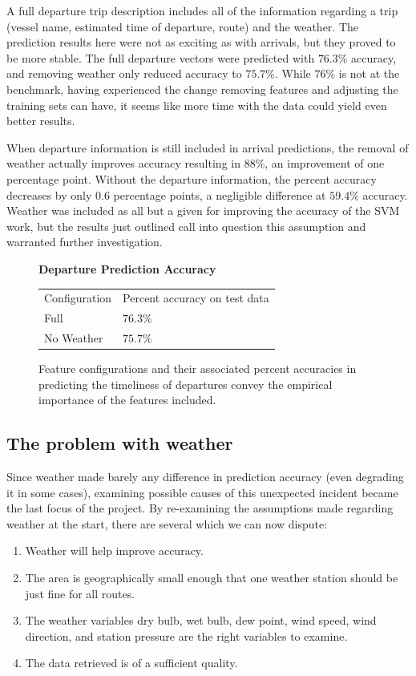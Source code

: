 \documentclass[11pt]{article} %
\begin{document}
A full departure trip description includes all of the information regarding a trip
(vessel name, estimated time of departure, route) and the weather. 
The prediction results here were not
as exciting as with arrivals, but they proved to be more stable. The full 
departure vectors were predicted with $76.3\%$ accuracy, and removing weather
only reduced accuracy to $75.7\%$. While $76\%$ is not at the benchmark, having
experienced the change removing features and adjusting the training sets can have,
it seems like more time with the data could yield even better results.

When departure information is still included in arrival predictions, the removal of 
weather actually improves accuracy resulting in $88\%$, an improvement of one
percentage point. Without the departure information, the percent accuracy decreases
by only $0.6$ percentage points, a negligible difference at $59.4\%$ accuracy. 
Weather was included as all but a given for improving the accuracy of the SVM
work, but the results just outlined call into question this assumption and 
warranted further investigation.

\begin{figure}
    \centering
    \textbf{Departure Prediction Accuracy}

    \begin{tabular}{ll}
        Configuration & Percent accuracy on test data\\
        Full        & $76.3\%$\\
        No Weather  & $75.7\%$\\
    \end{tabular}
    \caption{Feature configurations and their associated percent accuracies in
         predicting the timeliness of departures convey the empirical importance of 
         the features included.}
    \label{fig:second_run_data_departures}
\end{figure}

\subsection{The problem with weather}
\label{sec:weather_prob}
Since weather made barely any difference in prediction accuracy (even 
degrading it in some cases), examining possible causes of this unexpected 
incident became the last focus of the project. By re-examining the assumptions
made regarding weather at the start, there are several which we can now dispute:

\begin{enumerate}
    \item Weather will help improve accuracy.
    \item \label{wAssumption_oneStation} The area is geographically small enough 
        that one weather station should be just fine for all routes.
    \item The weather variables dry bulb, wet bulb, dew point, wind speed, 
        wind direction, and station pressure are the right variables to examine.
    \item The data retrieved is of a sufficient quality.
\end{enumerate}
\end{document}
